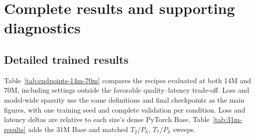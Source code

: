\FloatBarrier
\section{Complete results and supporting diagnostics}
\label{app:complete-results}

\subsection{Detailed trained results}
\label{app:endpoint-results}

Table~\ref{tab:endpoints-14m-70m} compares the recipes evaluated at both 14M
and 70M, including settings outside the favorable quality--latency trade-off.
Loss and model-wide sparsity use the same definitions and final checkpoints
as the main figures, with one training seed and complete validation per condition.
Loss and latency deltas are relative to each size's dense PyTorch Base. Table~\ref{tab:31m-results} adds the 31M Base and matched $T_2/P_h$, $T_7/P_h$ sweeps.

